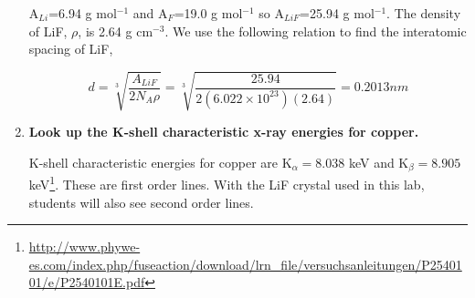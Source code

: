 \documentclass[justified]{tufte-book}
\begin{document}
\begin{enumerate}
A$_{Li}$=6.94 g mol$^{-1}$ and A$_{F}$=19.0 g mol$^{-1}$ so A$_{LiF}$=25.94 g mol$^{-1}$. The density of LiF, $\rho$, is 2.64 g cm$^{-3}$. We use the following relation to find the interatomic spacing of LiF,

\begin{equation}
d=\sqrt[3]{\dfrac{A_{LiF}}{2N_A\rho}}=\sqrt[3]{\dfrac{25.94}{2(6.022\times10^{23})(2.64)}}=0.2013nm
\label{equ:twcg2}
\end{equation}

\item {\bf Look up the K-shell characteristic x-ray energies for copper.}\newline

K-shell characteristic  energies for copper are K$_{\alpha}=8.038$ keV and K$_{\beta}=8.905$ keV\footnote{\url{http://www.phywe-es.com/index.php/fuseaction/download/lrn_file/versuchsanleitungen/P2540101/e/P2540101E.pdf}}. These are first order lines. With the LiF crystal used in this lab, students will also see second order lines.

\end{enumerate}
\end{document}
